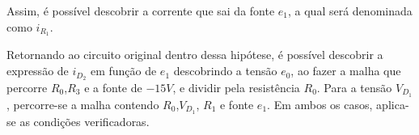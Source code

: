 \documentclass{article}
\numberwithin{equation}{section}
\newlength\Colsep
\let\dfr\dfrac
\begin{document}
\noindent\begin{minipage}{0.95\textwidth}
\begin{minipage}[c][3cm][c]{\dimexpr0.6\textwidth-0.5\Colsep\relax}
    \begin{center}
    \end{center}
\end{minipage} \hfill
\begin{minipage}[c][3cm][c]{\dimexpr0.4\textwidth-0.5\Colsep\relax}
    Assim, é possível descobrir a corrente que sai da fonte $e_1$, a qual será denominada como $i_{R_1}$.
\end{minipage}
\end{minipage}

\noindent\begin{minipage}{0.95\textwidth}
\begin{minipage}[c][7cm][c]{\dimexpr0.6\textwidth-0.5\Colsep\relax}
    \begin{center}
    \end{center}
\end{minipage} \hfill
\begin{minipage}[c][7cm][c]{\dimexpr0.4\textwidth-0.5\Colsep\relax}
    Retornando ao circuito original dentro dessa hipótese, é possível descobrir a expressão de $i_{D_2}$ em função de $e_1$ descobrindo a tensão $e_0$, ao fazer a malha que percorre $R_0$,$R_3$ e a fonte de $-15V$, e dividir pela resistência $R_0$. Para a tensão $V_{D_1}$, percorre-se a malha contendo $R_0$,$V_{D_1}$, $R_1$ e fonte $e_1$. Em ambos os casos, aplica-se as condições verificadoras.
\end{minipage}
\end{minipage}
\end{document}
